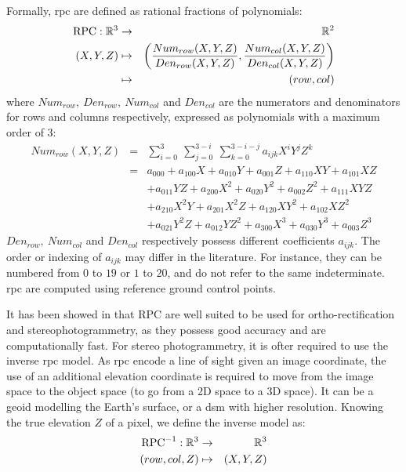 Formally, \acrshort{rpc} are defined as rational fractions of polynomials:  
\begin{eqnarray*}
    {\mathrm{RPC}}:\mathbb{R}^3 &\rightarrow&\mathbb{R}^2\\
    (X,Y,Z) 	&\mapsto& \left(\frac{Num_{row}(X,Y,Z)}{Den_{row}(X,Y,Z)}, \frac{Num_{col}(X,Y,Z)}{Den_{col}(X,Y,Z)}\right)\\
    &\mapsto&(row,col)
\end{eqnarray*}
where $Num_{row},~Den_{row},~Num_{col}$ and $Den_{col}$ are the numerators and denominators for rows and columns respectively, expressed as polynomials with a maximum order of $3$:
\begin{eqnarray*}
    Num_{row}(X,Y,Z) &=& \sum_{i=0}^3~\sum_{j=0}^{3-i}~\sum_{k=0}^{3-i-j}a_{ijk}X^iY^jZ^k\\
    &=& a_{000} + a_{100} X + a_{010} Y + a_{001} Z + a_{110} XY + a_{101} XZ \\
    &&+ a_{011} YZ + a_{200} X^2 + a_{020} Y^2 + a_{002} Z^2 + a_{111} XYZ \\
    && + a_{210} X^2Y + a_{201} X^2Z + a_{120} XY^2 + a_{102} XZ^2\\
    && + a_{021} Y^2Z + a_{012} YZ^2 + a_{300} X^3 + a_{030} Y^3 + a_{003} Z^3
\end{eqnarray*}
$Den_{row},~Num_{col}$ and $Den_{col}$ respectively possess different coefficients $a_{ijk}$. The order or indexing of $a_{ijk}$ may differ in the literature. For instance, they can be numbered from $0$ to $19$ or $1$ to $20$, and do not refer to the same indeterminate. \acrshort{rpc} are computed using reference ground control points.

It has been showed in \cite{baltsavias_metric_1992} that RPC are well suited to be used for ortho-rectification and stereophotogrammetry, as they possess good accuracy and are computationally fast. For stereo photogrammetry, it is ofter required to use the inverse \acrshort{rpc} model. As \acrshort{rpc} encode a line of sight given an image coordinate, the use of an additional elevation coordinate is required to move from the image space to the object space (\ie to go from a 2D space to a 3D space). It can be a geoid modelling the Earth's surface, or a \acrshort{dsm} with higher resolution. Knowing the true elevation $Z$ of a pixel, we define the inverse model as:
\begin{eqnarray*}
    {\mathrm{RPC}}^{-1}:\mathbb{R}^3 &\rightarrow&\mathbb{R}^3\\
    (row, col, Z) 	&\mapsto& (X,Y,Z)
\end{eqnarray*}

